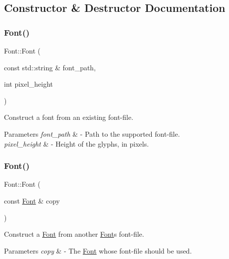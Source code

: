 \subsection{Constructor \& Destructor Documentation}
\mbox{\label{class_font_a42440c9f8cbae982974288d28d65816a}} 
\subsubsection{\texorpdfstring{Font()}{Font()}\hspace{0.1cm}{\footnotesize\ttfamily [1/3]}}
{\footnotesize\ttfamily Font\+::\+Font (\begin{DoxyParamCaption}\item[{const std\+::string \&}]{font\+\_\+path,  }\item[{int}]{pixel\+\_\+height }\end{DoxyParamCaption})}

Construct a font from an existing font-\/file. 
\begin{DoxyParams}{Parameters}
{\em font\+\_\+path} & -\/ Path to the supported font-\/file. \\
\hline
{\em pixel\+\_\+height} & -\/ Height of the glyphs, in pixels. \\
\hline
\end{DoxyParams}
\mbox{\label{class_font_a90f63d6bc3c7813ec94906b2305d270e}} 
\subsubsection{\texorpdfstring{Font()}{Font()}\hspace{0.1cm}{\footnotesize\ttfamily [2/3]}}
{\footnotesize\ttfamily Font\+::\+Font (\begin{DoxyParamCaption}\item[{const \mbox{\hyperlink{class_font}{Font}} \&}]{copy }\end{DoxyParamCaption})}

Construct a \mbox{\hyperlink{class_font}{Font}} from another \mbox{\hyperlink{class_font}{Font}}\textquotesingle{}s font-\/file. 
\begin{DoxyParams}{Parameters}
{\em copy} & -\/ The \mbox{\hyperlink{class_font}{Font}} whose font-\/file should be used. \\
\hline
\end{DoxyParams}
\mbox{\label{class_font_ac7ae7201a9874e59f332e264885ec686}} 
